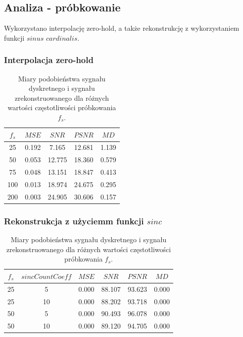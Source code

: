 \documentclass{article}
\begin{document}
\subsection{Analiza - próbkowanie}
Wykorzystano interpolację zero-hold, a także rekonstrukcję z wykorzystaniem funkcji $sinus$ $cardinalis$.
\subsubsection{Interpolacja zero-hold}
\begin{table}[H]
\centering
\begin{tabular}{|c | c | c | c | c|}
 \hline
 $f_s$ & $MSE$ & $SNR$ & $PSNR$ & $MD$ \\
 \hline
 25 & 0.192 & 7.165 & 12.681 & 1.139 \\
 \hline
 50 & 0.053 & 12.775 & 18.360 & 0.579 \\
 \hline
 75 & 0.048 & 13.151 & 18.847 & 0.413 \\
 \hline
 100 & 0.013 & 18.974 & 24.675 & 0.295 \\
 \hline
 200 & 0.003 & 24.905 & 30.606 & 0.157 \\
 \hline
\end{tabular}
\caption{Miary podobieństwa sygnału dyskretnego i sygnału zrekonstruowanego dla różnych wartości częstotliwości próbkowania $f_s$.}
\label{table:zero_hold_sampling}
\end{table}

\subsubsection{Rekonstrukcja z użyciemm funkcji $sinc$}
\begin{table}[H]
\centering
\begin{tabular}{|c | c | c | c | c | c|}
 \hline
 $f_s$ & $sincCountCoeff$ & $MSE$ & $SNR$ & $PSNR$ & $MD$ \\
 \hline
 25 & 5 & 0.000 & 88.107 & 93.623 & 0.000 \\
 \hline
 25 & 10 & 0.000 & 88.202 & 93.718 & 0.000 \\
 \hline
 50 & 5 & 0.000 & 90.493 & 96.078 & 0.000 \\
 \hline
 50 & 10 & 0.000 & 89.120 & 94.705 & 0.000 \\
 \hline
\end{tabular}
\caption{Miary podobieństwa sygnału dyskretnego i sygnału zrekonstruowanego dla różnych wartości częstotliwości próbkowania $f_s$.}
\label{table:sinc_sampling}
\end{table}
\end{document}
